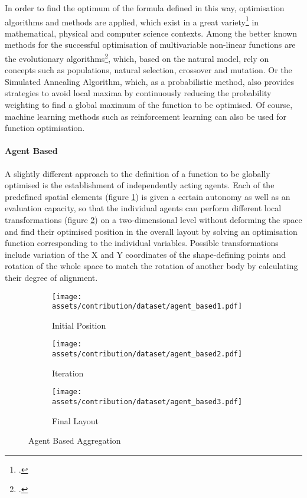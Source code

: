 \documentclass[a4paper, 12pt]{report}
\begin{document}
In order to find the optimum of the formula defined in this way, optimisation algorithms and methods are applied, which exist in a great variety\footcite{pena2021artificial} in mathematical, physical and computer science contexts. Among the better known methods for the successful optimisation of multivariable non-linear functions are the evolutionary algorithms\footcites{caetano2020computational}{grzesiak2021evolutionary}, which, based on the natural model, rely on concepts such as populations, natural selection, crossover and mutation. Or the Simulated Annealing Algorithm, which, as a probabilistic method, also provides strategies to avoid local maxima by continuously reducing the probability weighting to find a global maximum of the function to be optimised. Of course, machine learning methods such as reinforcement learning can also be used for function optimisation.

\paragraph{Agent Based}\label{par:agent-based}

A slightly different approach to the definition of a function to be globally optimised is the establishment of independently acting agents. Each of the predefined spatial elements (figure \ref{fig:initial-disposition}) is given a certain autonomy as well as an evaluation capacity, so that the individual agents can perform different local transformations (figure \ref{fig:iteration-7}) on a two-dimensional level without deforming the space and find their optimised position in the overall layout by solving an optimisation function corresponding to the individual variables. Possible transformations include variation of the X and Y coordinates of the shape-defining points and rotation of the whole space to match the rotation of another body by calculating their degree of alignment.

\begin{figure}
\centering
\begin{subfigure}{.31\textwidth}
\centering
\texttt{[image: assets/contribution/dataset/agent\_based1.pdf]}
\caption{Initial Position}
\label{fig:initial-disposition}
\end{subfigure}%
\begin{subfigure}{.32\textwidth}
\centering
\texttt{[image: assets/contribution/dataset/agent\_based2.pdf]}
\caption{Iteration}
\label{fig:iteration-7}
\end{subfigure}%
\begin{subfigure}{.34\textwidth}
\centering
\texttt{[image: assets/contribution/dataset/agent\_based3.pdf]}
\caption{Final Layout}
\label{fig:final-layout-1}
\end{subfigure}
\caption{Agent Based Aggregation}
\label{fig:agent-based-aggregation}
\end{figure}
\end{document}
